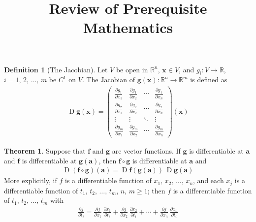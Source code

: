 \documentclass[10pt]{beamer}
\title{Review of Prerequisite Mathematics}
\author{}
\date{}
\DeclareMathOperator*{\jac}{D}
\theoremstyle{definition}
\newtheorem*{dfn}{Definition}
\newtheorem*{thm}{Theorem}
\newcommand{\va}{\mathbf{a}}
\newcommand{\vx}{\mathbf{x}}
\newcommand{\vf}{\mathbf{f}}
\newcommand{\vg}{\mathbf{g}}
\newcommand{\pdiff}[2]{\frac{\partial #1}{\partial #2}}
\begin{document}
\begin{frame}
\titlepage
\end{frame}

\begin{frame}
\begin{dfn}[The Jacobian]
  Let $V$ be open in $\mathbb{R}^n$, $\vx\in V$, and $g_i:V\to\mathbb{R}$, $i = 1,\,2,\,\ldots,\,m$ be $C^1$ on $V$. The Jacobian of $\vg(\vx): \mathbb{R}^n\to\mathbb{R}^m$ is defined as
  \begin{align*}
    \jac\vg(\vx) = %
    \begin{pmatrix}
      \frac{\partial g_1}{\partial x_1} & \frac{\partial g_1}{\partial x_2} & \cdots & \frac{\partial g_1}{\partial x_{\!n}} \\
      \frac{\partial g_2}{\partial x_1} & \frac{\partial g_2}{\partial x_2} & \cdots & \frac{\partial g_2}{\partial x_{\!n}} \\
      \vdots & \vdots & \ddots &\vdots \\
      \frac{\partial g_m}{\partial x_1} & \frac{\partial g_m}{\partial x_2} & \cdots & \frac{\partial g_m}{\partial x_{\!n}}
    \end{pmatrix}(\vx)
  \end{align*}
\end{dfn}
\begin{thm}%
  Suppose that $\vf$ and $\vg$ are vector functions. If $\vg$ is differentiable at $\va$ and $\vf$ is differentiable at $\vg(\va)$, then $\vf\circ\vg$ is differentiable at $\va$ and
  \begin{align*}
    \jac(\vf\circ\vg)(\va) = \jac\vf(\vg(\va))\,\jac\vg(\va)
  \end{align*}
  More explicitly, if $f$ is a differentiable function of $x_1,\,x_2,\,\ldots,\,x_n$, and each $x_j$ is a differentiable function of $t_1,\,t_2,\,\ldots,\,t_m$, $n$, $m\geqslant 1$; then $f$ is a differentiable function of $t_1,\,t_2,\,\ldots,\,t_m$ with
  \begin{align*}
    \pdiff{f}{t_i} = \pdiff{f}{x_1}\,\pdiff{x_1}{t_i} + \pdiff{f}{x_2}\,\pdiff{x_2}{t_i} + \cdots + \pdiff{f}{x_n}\,\pdiff{x_n}{t_i}
  \end{align*}
\end{thm}
\end{frame}
\end{document}
